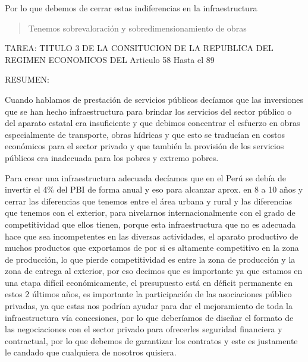 \documentclass[
  jou,
  floatsintext,
  longtable,
  a4paper,
  nolmodern,
  notxfonts,
  notimes,
  12pt,
  colorlinks=true,linkcolor=blue,citecolor=blue,urlcolor=blue]{apa7}
\begin{document}
Por lo que debemos de cerrar estas indiferencias en la infraestructura

\begin{quote}
Tenemos sobrevaloración y sobredimensionamiento de obras
\end{quote}

TAREA: TITULO 3 DE LA CONSITUCION DE LA REPUBLICA DEL REGIMEN ECONOMICOS
DEL Articulo 58 Hasta el 89

RESUMEN:

Cuando hablamos de prestación de servicios públicos decíamos que las
inversiones que se han hecho infraestructura para brindar los servicios
del sector público o del aparato estatal era insuficiente y que debimos
concentrar el esfuerzo en obras especialmente de transporte, obras
hídricas y que esto se traducían en costos económicos para el sector
privado y que también la provisión de los servicios públicos era
inadecuada para los pobres y extremo pobres.

Para crear una infraestructura adecuada decíamos que en el Perú se debía
de invertir el 4\% del PBI de forma anual y eso para alcanzar aprox. en
8 a 10 años y cerrar las diferencias que tenemos entre el área urbana y
rural y las diferencias que tenemos con el exterior, para nivelarnos
internacionalmente con el grado de competitividad que ellos tienen,
porque esta infraestructura que no es adecuada hace que sea
incompetentes en las diversas actividades, el aparato productivo de
muchos productos que exportamos de por si es altamente competitivo en la
zona de producción, lo que pierde competitividad es entre la zona de
producción y la zona de entrega al exterior, por eso decimos que es
importante ya que estamos en una etapa difícil económicamente, el
presupuesto está en déficit permanente en estos 2 últimos años, es
importante la participación de las asociaciones público privadas, ya que
estas nos podrían ayudar para dar el mejoramiento de toda la
infraestructura vía concesiones, por lo que deberíamos de diseñar el
formato de las negociaciones con el sector privado para ofrecerles
seguridad financiera y contractual, por lo que debemos de garantizar los
contratos y este es justamente le candado que cualquiera de nosotros
quisiera.
\end{document}
